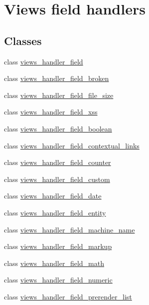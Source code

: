 \hypertarget{group__views__field__handlers}{
\section{Views field handlers}
\label{group__views__field__handlers}
}
\subsection*{Classes}
\begin{DoxyCompactItemize}
\item 
class \hyperlink{classviews__handler__field}{views\_\-handler\_\-field}
\item 
class \hyperlink{classviews__handler__field__broken}{views\_\-handler\_\-field\_\-broken}
\item 
class \hyperlink{classviews__handler__field__file__size}{views\_\-handler\_\-field\_\-file\_\-size}
\item 
class \hyperlink{classviews__handler__field__xss}{views\_\-handler\_\-field\_\-xss}
\item 
class \hyperlink{classviews__handler__field__boolean}{views\_\-handler\_\-field\_\-boolean}
\item 
class \hyperlink{classviews__handler__field__contextual__links}{views\_\-handler\_\-field\_\-contextual\_\-links}
\item 
class \hyperlink{classviews__handler__field__counter}{views\_\-handler\_\-field\_\-counter}
\item 
class \hyperlink{classviews__handler__field__custom}{views\_\-handler\_\-field\_\-custom}
\item 
class \hyperlink{classviews__handler__field__date}{views\_\-handler\_\-field\_\-date}
\item 
class \hyperlink{classviews__handler__field__entity}{views\_\-handler\_\-field\_\-entity}
\item 
class \hyperlink{classviews__handler__field__machine__name}{views\_\-handler\_\-field\_\-machine\_\-name}
\item 
class \hyperlink{classviews__handler__field__markup}{views\_\-handler\_\-field\_\-markup}
\item 
class \hyperlink{classviews__handler__field__math}{views\_\-handler\_\-field\_\-math}
\item 
class \hyperlink{classviews__handler__field__numeric}{views\_\-handler\_\-field\_\-numeric}
\item 
class \hyperlink{classviews__handler__field__prerender__list}{views\_\-handler\_\-field\_\-prerender\_\-list}

\end{DoxyCompactItemize}
